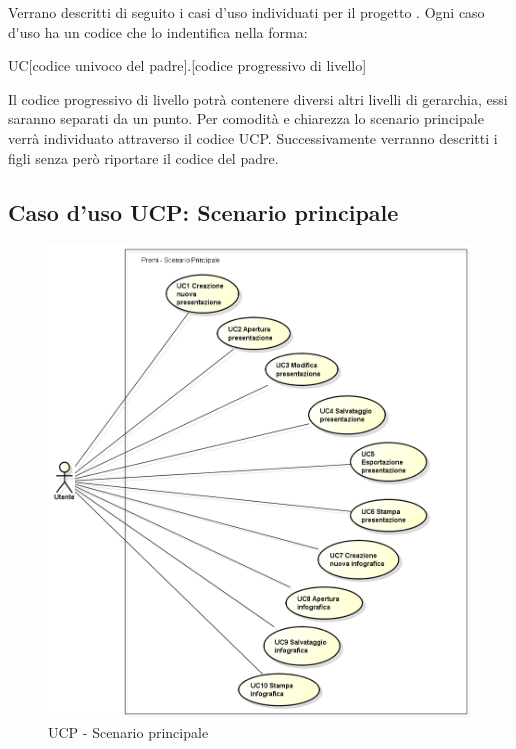 Verrano descritti di seguito i casi d'uso individuati per il progetto \PROGETTO. Ogni \gls{caso d'uso} ha un codice che lo indentifica nella forma:
\begin{center}
	UC[codice univoco del padre].[codice progressivo di livello]
\end{center}
Il codice progressivo di livello potrà contenere diversi altri livelli di gerarchia, essi saranno separati da un punto. Per comodità e chiarezza lo scenario principale verrà individuato attraverso il codice UCP. Successivamente verranno descritti i figli senza però riportare il codice del padre.

\subsection{Caso d'uso UCP: Scenario principale}
\begin{figure}[h] 
	\centering 
	\includegraphics[scale=0.5] {img/UCP.png} 
	\caption{UCP - Scenario principale} 
\end{figure}

\newpage

